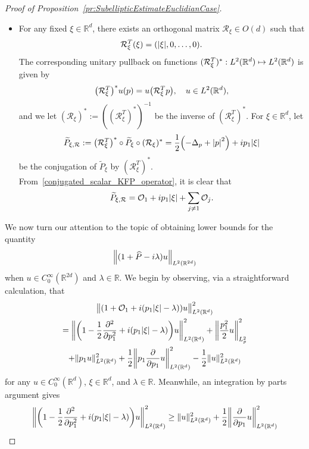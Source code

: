 \documentclass[AHL,Unicode,longabstracts]{cedram}
\newcommand{\R}{\mathbb{R}}
\newcommand{\clO}{\mathcal{O}}
\newcommand{\clR}{\mathcal{R}}
\newcommand{\p}{\partial}
\newcommand{\abs}[1]{\left| #1 \right|}
\newcommand\norm[1]{\left\lVert#1\right\rVert}
\let\oldhat\hat
\renewcommand*{\hat}[1]{\mathchoice{\widehat{#1}}{\widehat{#1}}{\oldhat{#1}}{\oldhat{#1}}}
\let\originalleft\left
\let\originalright\right
\renewcommand{\left}{\mathopen{}\mathclose\bgroup\originalleft}
\renewcommand{\right}{\aftergroup\egroup\originalright}
\let\oldmapsto\mapsto
\renewcommand*{\mapsto}{\mathchoice{\longmapsto}{\oldmapsto}{\oldmapsto}{\oldmapsto}}
\begin{document}
\begin{proof}[{Proof of Proposition~\ref{pr:SubellipticEstimateEuclidianCase}}]
\begin{itemize}
\item For any fixed $\xi \in \R^d$, there exists an orthogonal matrix $\clR_\xi \in O(d)$ such that
\begin{equation}\label{definition_of_R_xi}
\clR^T_\xi(\xi) = \left(\abs{\xi}, 0, \dots, 0 \right).
\end{equation}
The corresponding unitary pullback on functions $(\clR^T_\xi)^*: L^2(\R^d) \mapsto L^2(\R^d)$ is given by
\begin{align*}
\left(\clR^T_\xi\right)^* u(p) = u\left(\clR^T_\xi p\right), \quad  u \in L^2(\R^d),
\end{align*}
and we let $(\clR_\xi)^* := ((\clR^T_\xi )^*)^{-1}$ be the inverse of $(\clR^T_\xi)^*$. For $\xi \in \R^d$, let
\begin{equation}\label{conjugated_scalar_KFP_operator}
\widetilde{P}_{\xi, \clR} := \left(\clR^T_\xi\right)^* \circ \widetilde{P}_\xi \circ (\clR_\xi)^* = \frac{1}{2} \left(-\Delta_p + \abs{p}^2 \right) + ip_1 \abs{\xi}
\end{equation}
be the conjugation of $\widetilde{P}_\xi$ by $(\clR^T_\xi)^*$. From~\eqref{conjugated_scalar_KFP_operator}, it is clear that
\begin{equation}
\widetilde{P}_{\xi, \clR} = \clO_1 + ip_1 \abs{\xi} + \sum_{j \neq 1} \clO_j.
\end{equation}
\end{itemize}
We now turn our attention to the topic of obtaining lower bounds for the quantity
\begin{equation}
\norm{(1+\hat{P}-i\lambda)u}_{L^2(\R^{2d})}
\end{equation}
when $u \in C^\infty_0(\R^{2d})$ and $\lambda \in \R$. We begin by observing, via a straightforward calculation, that
\begin{multline}\label{eq:ExpansionInNormOfThe1DHatP}
\bigl\| (1+\clO_1+i(p_1 |\xi| -\lambda))u \bigr\|_{L^2(\R^d)}^{2}\\
=
\left\|
\left(1-\frac{1}{2}\frac{\p^2}{\p p_1^2}+i(p_{1}|\xi|-\lambda)\right)u
\right\|_{L^2(\R^d)}^{2} +
\left\|
\frac{p_{1}^{2}}{2} u
\right\|_{L^2_p}^{2}
\\
+ \| p_{1}u\|_{L^2(\R^d)}^{2} +
\frac{1}{2}\left\| p_{1} \frac{\partial}{\partial p_{1}}u
\right\|_{L^2(\R^d)}^{2} - \frac{1}{2}\|u\|_{L^2(\R^d)}^2
\end{multline}
for any $u \in C^\infty_0(\R^d)$, $\xi \in \R^d$, and $\lambda \in \R$. Meanwhile, an integration by parts argument gives
\begin{equation}\label{eq:InequalityIpp1D}
\left\|\left(1-\frac{1}{2} \frac{\p^2}{\p p^2_1}+i(p_{1}|\xi|-\lambda)\right) u \right\|^{2}_{L^2(\R^d)} \geq \|u\|^{2}_{L^2(\R^d)} +\frac{1}{2} \left\| \frac{\partial}{\partial p_{1}}u\right\|^{2}_{L^2(\R^d)}

\end{equation}
\end{proof}
\end{document}
